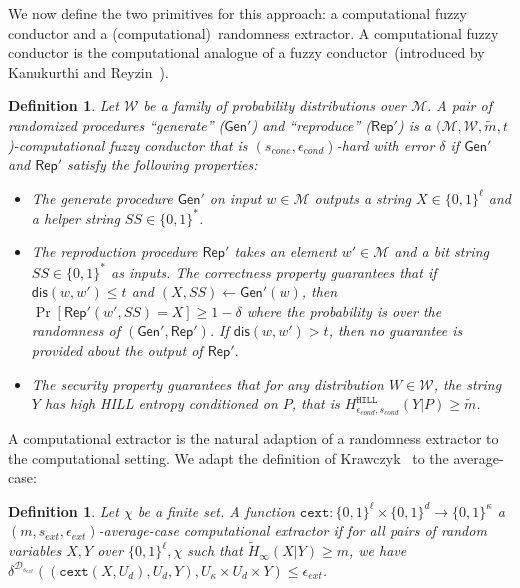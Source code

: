 \documentclass[11pt]{article}
\newcommand{\class}[1]{{\ensuremath{\mathsf{#1}}}}
\newcommand{\gen}{\ensuremath{\class{Gen}}\xspace}
\newcommand{\rep}{\ensuremath{\class{Rep}}\xspace}
\newcommand{\zo}{\ensuremath{\{0, 1\}}}
\newcommand{\dis}{\ensuremath{\mathsf{dis}}}
\newcommand{\hill}{\ensuremath{\mathtt{HILL}}\xspace}
\newcommand{\cext}{\ensuremath{\mathtt{cext}}}
\newtheorem{definition}[theorem]{Definition}
\begin{document}
We now define the two primitives for this approach: a computational fuzzy conductor and a (computational)~randomness extractor.  A computational fuzzy conductor is the computational analogue of a fuzzy conductor~(introduced by Kanukurthi and Reyzin~\cite{KanukurthiR09}).
\begin{definition}
\label{def:comp fuzzy cond}
Let $\mathcal{W}$ be a family of probability distributions over $\mathcal{M}$.  A pair of randomized procedures ``generate'' ($\gen'$) and ``reproduce'' ($\rep'$) is a $(\mathcal{M}, \mathcal{W}, \tilde{m}, t$)-computational fuzzy conductor that is $(s_{cone}, \epsilon_{cond})$-hard with error $\delta$ if $\gen'$ and $\rep'$ satisfy the following properties:
\begin{itemize}
\item The generate procedure $\gen'$ on input $w\in \mathcal{M}$ outputs a string $X\in\{0,1\}^\ell$ and a helper string $SS\in\{0,1\}^*$.
\item The reproduction procedure $\rep'$ takes an element $w'\in\mathcal{M}$ and a bit string $SS\in\{0,1\}^*$ as inputs.  The \emph{correctness} property guarantees that if $\dis(w, w')\leq t$ and $(X, SS)\leftarrow \gen'(w)$, then $\Pr[\rep'( w', SS) = X] \geq 1-\delta$ where the probability is over the randomness of $(\gen', \rep')$.
If $\dis(w, w') > t$, then no guarantee is provided about the output of $\rep'$.
\item The \emph{security} property guarantees that for any distribution $W\in \mathcal{W}$, the string $Y$ has high HILL entropy conditioned on $P$, that is $H^{\hill}_{\epsilon_{cond}, s_{cond}}(Y |P)\geq \tilde{m}$.
\end{itemize}
\end{definition}

A computational extractor is the natural adaption of a randomness extractor to the computational setting.  We adapt the definition of Krawczyk~\cite{krawczyk2010cryptographic} to the average-case:
\begin{definition}
Let $\chi$ be a finite set.
A function $\cext: \zo^\ell \times \{0,1\}^d \rightarrow \{0,1\}^\kappa$ a \emph{$(m, s_{ext}, \epsilon_{ext})$-average-case computational extractor} if for all pairs
of random variables $X, Y$ over $\zo^\ell, \chi$ such that
$\tilde{H}_\infty(X|Y) \ge m$, we have $\delta^{\mathcal{D}_{s_{ext}}}((\cext(X, U_d), U_d, Y), U_\kappa\times
U_d \times Y) \le \epsilon_{ext}$.
\end{definition}
\end{document}
